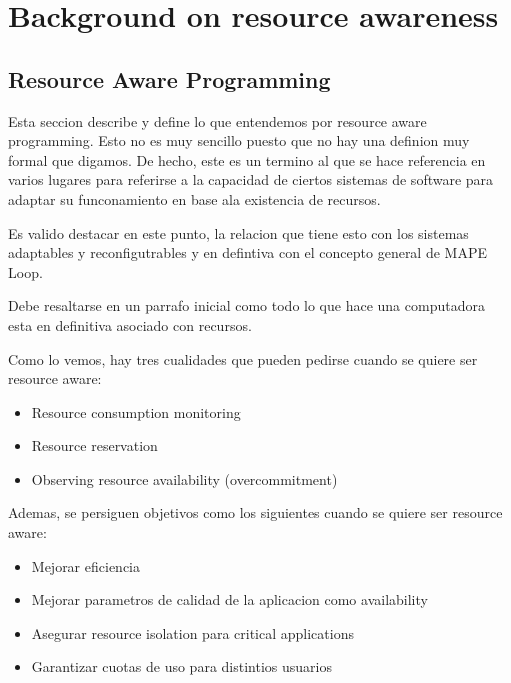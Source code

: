 \chapter{Background on resource awareness}
\label{chp:background_resource_awareness}


\section{Resource Aware Programming}

Esta seccion describe y define lo que entendemos por resource aware programming. Esto no es muy sencillo puesto que no hay una definion muy formal que digamos. De hecho, este es un termino al que se hace referencia en varios lugares para referirse a la capacidad de ciertos sistemas de software para adaptar su funconamiento en base ala existencia de recursos.

Es valido destacar en este punto,  la relacion que tiene esto con los sistemas adaptables y reconfigutrables y en defintiva con el concepto general de MAPE Loop.

Debe resaltarse en un parrafo inicial como todo lo que hace una computadora esta en definitiva asociado con recursos.

Como lo vemos, hay tres cualidades que pueden pedirse cuando se quiere ser resource aware:
\begin{itemize}
\item Resource consumption monitoring
\item Resource reservation
\item Observing resource availability (overcommitment) 
\end{itemize}

Ademas, se persiguen objetivos como los siguientes cuando se quiere ser resource aware:
\begin{itemize}
\item Mejorar eficiencia
\item Mejorar parametros de calidad de la aplicacion como availability
\item Asegurar resource isolation para critical applications
\item Garantizar cuotas de uso para distintios usuarios
\end{itemize}

